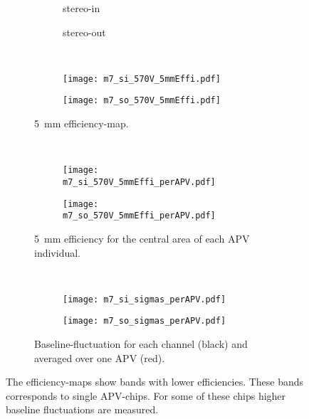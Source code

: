 \documentclass[
twoside,            %
BCOR1.4cm,          %
10pt,               %
headings=normal,    %
headsepline,        %
clearplainpage,		%
final,              %
div=14,
open=right,
bibliography=toc
]{scrreprt}
\begin{document}
\begin{figure}[!h]
	\begin{subfigure}[b]{\textwidth}
		\begin{subfigure}[b]{0.45\textwidth}
			\centering
			stereo-in
		\end{subfigure}
		\hfill
		\begin{subfigure}[b]{0.45\textwidth}
			\centering
			stereo-out
		\end{subfigure}
	\end{subfigure}
	\vspace{1mm}
	\\
	\begin{subfigure}[b]{\textwidth}
		\begin{subfigure}[b]{0.45\textwidth}
			\centering
			\texttt{[image: m7\_si\_570V\_5mmEffi.pdf]}
		\end{subfigure}
		\hfill
		\begin{subfigure}[b]{0.45\textwidth}
			\centering
			\texttt{[image: m7\_so\_570V\_5mmEffi.pdf]}
		\end{subfigure}
		\caption{
			\SI{5}{mm} efficiency-map.
		}
		\label{m7stereo5mmEffi}
	\end{subfigure}
	\vspace{1mm}
	\\
	\begin{subfigure}[b]{\textwidth}
		\begin{subfigure}[b]{0.45\textwidth}
			\centering
			\texttt{[image: m7\_si\_570V\_5mmEffi\_perAPV.pdf]}
		\end{subfigure}
		\hfill
		\begin{subfigure}[b]{0.45\textwidth}
			\centering
			\texttt{[image: m7\_so\_570V\_5mmEffi\_perAPV.pdf]}
		\end{subfigure}
		\caption{
			\SI{5}{mm} efficiency for the central area of each APV individual.
		}
		\label{m7stereo5mmEffiCentral}
	\end{subfigure}
	\vspace{1mm}
	\\
	\begin{subfigure}[b]{\textwidth}
		\begin{subfigure}[b]{0.48\textwidth}
			\centering
			\texttt{[image: m7\_si\_sigmas\_perAPV.pdf]}
		\end{subfigure}
		\hfill
		\begin{subfigure}[b]{0.48\textwidth}
			\centering
			\texttt{[image: m7\_so\_sigmas\_perAPV.pdf]}
		\end{subfigure}
		\caption{
			Baseline-fluctuation for each channel (black) and averaged over one APV (red).
		}
		\label{m7stereoSigma}
	\end{subfigure}
	\vspace{-4mm}
	\caption{
		The efficiency-maps show bands with lower efficiencies.
		These bands corresponds to single APV-chips.
		For some of these chips higher baseline fluctuations are measured.
	}
	\label{efficiencySpoiledByNoise} 
\end{figure}
\end{document}
